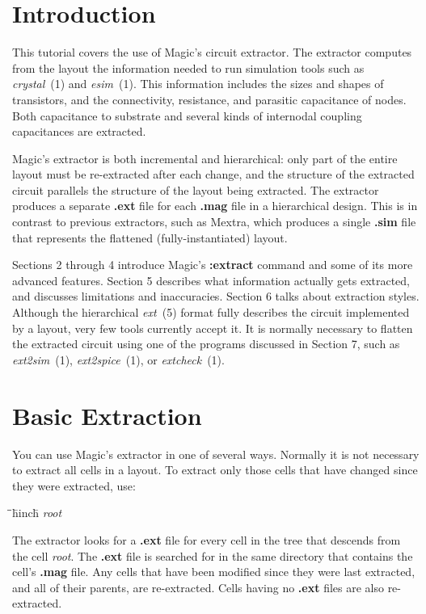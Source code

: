 \documentclass[letterpaper,twoside,12pt]{article}
\def\hinch{\hspace*{0.5in}}
\def\starti{\begin{center}\begin{tabbing}\hinch\=\hinch\=\hinch\=hinch\hinch\=\kill}
\def\endi{\end{tabbing}\end{center}}
\def\ii{\>\>\>}
\begin{document}
\section{Introduction}

This tutorial covers the use of Magic's
circuit extractor.
The extractor computes from the layout the information needed
to run simulation tools such as {\itshape crystal}~(1) and {\itshape esim}~(1).
This information includes the sizes and shapes of transistors,
and the connectivity, resistance, and parasitic capacitance of nodes.
Both capacitance to substrate and several kinds of internodal
coupling capacitances are extracted.

Magic's extractor is both incremental and hierarchical:
only part of the entire layout must be re-extracted after each change,
and the structure of the extracted
circuit parallels the structure of the layout being extracted.
The extractor produces a separate {\bfseries .ext} file
for each {\bfseries .mag} file in a hierarchical design.
This is in contrast to previous extractors, such as Mextra,
which produces a single {\bfseries .sim} file that represents
the flattened (fully-instantiated) layout.

Sections 2 through 4 introduce Magic's {\bfseries :extract} command
and some of its more advanced features.
Section 5 describes what information actually gets extracted, and
discusses limitations and inaccuracies.
Section 6 talks about extraction styles.
Although the hierarchical {\itshape ext}~(5) format fully describes the
circuit implemented by a layout, very few tools currently accept it.
It is normally necessary to flatten the extracted circuit using
one of the programs discussed in Section 7, such as {\itshape ext2sim}~(1),
{\itshape ext2spice}~(1), or {\itshape extcheck}~(1).

\section{Basic Extraction}

You can use Magic's extractor in one of several ways.
Normally it is not necessary to extract all cells in a layout.
To extract only those cells that have changed since they were extracted, use:

\starti
   \ii {\bfseries :load} {\itshape root} \\
   \ii {\bfseries :extract}
\endi

The extractor looks for a {\bfseries .ext} file for every cell in the tree
that descends from the cell {\itshape root}.
The {\bfseries .ext} file is searched for in the same directory that
contains the cell's {\bfseries .mag} file.
Any cells that have been modified since they were last extracted,
and all of their parents, are re-extracted.
Cells having no {\bfseries .ext} files are also re-extracted.
\end{document}
